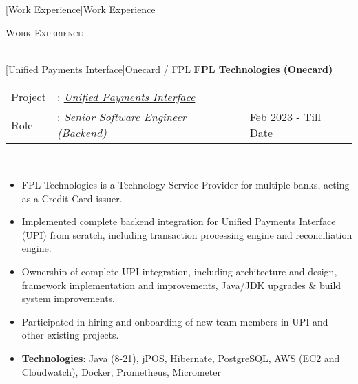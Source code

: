 \documentclass[a4paper]{article}
\newcommand{\lineunder} {
    \vspace*{-8pt} \\
    \hspace*{-18pt} \hrulefill \\
}
\newcommand{\header} [1] {
    {\hspace*{-18pt}\vspace*{6pt} \textsc{#1}}
    \vspace*{-6pt} \lineunder
}
\begin{document}
[Work Experience]{Work Experience}
\header{Work Experience}
\vspace{1mm}

[Unified Payments Interface]{Onecard / FPL}
\textbf{FPL Technologies (Onecard)} \\
\noindent
\begin{tabularx}{\textwidth}{ l l>{\raggedleft\arraybackslash}X}
  Project & : \textit{\href{https://en.wikipedia.org/wiki/Unified_Payments_Interface}{Unified Payments Interface}} & \\
  Role & : \textit{Senior Software Engineer (Backend)}  & Feb 2023 - Till Date \\
\end{tabularx}
\textbf{} \\
\begin{itemize} \itemsep 1pt
  \item FPL Technologies is a Technology Service Provider for multiple banks, acting as a Credit Card issuer.
  \item Implemented complete backend integration for Unified Payments Interface (UPI) from scratch, including transaction processing engine and reconciliation engine.
  \item Ownership of complete UPI integration, including architecture and design, framework implementation and improvements, Java/JDK upgrades \& build system improvements.
  \item Participated in hiring and onboarding of new team members in UPI and other existing projects.
  \item \textbf{Technologies}: Java (8-21), jPOS, Hibernate, PostgreSQL, AWS (EC2 and Cloudwatch), Docker, Prometheus, Micrometer
\end{itemize}
\end{document}
